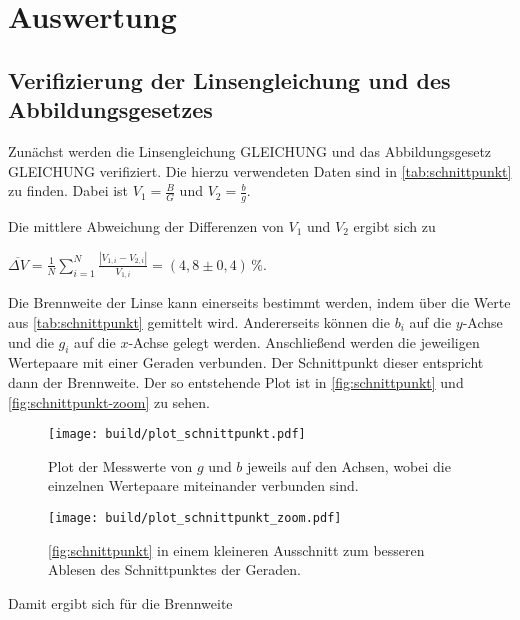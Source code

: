 \section{Auswertung}
\label{sec:Auswertung}

\subsection{Verifizierung der Linsengleichung und des Abbildungsgesetzes}

Zunächst werden die Linsengleichung GLEICHUNG und das Abbildungsgesetz GLEICHUNG verifiziert.
Die hierzu verwendeten Daten sind in \autoref{tab:schnittpunkt} zu finden.
Dabei ist $V_1 = \frac{B}{G}$ und $V_2 = \frac{b}{g}$.



Die mittlere Abweichung der Differenzen von $V_1$ und $V_2$ ergibt sich zu

\begin{center}
    $\overline{\Delta V} = \frac{1}{N} \sum^N_{i=1} \frac{| V_{1,i} - V_{2,i} |}{V_{1,i}} = (4,8 \pm 0,4) \, \%$.
\end{center}

Die Brennweite der Linse kann einerseits bestimmt werden, indem über die Werte aus \autoref{tab:schnittpunkt} gemittelt wird.
Andererseits können die $b_i$ auf die $y$-Achse und die $g_i$ auf die $x$-Achse gelegt werden. Anschließend werden die jeweiligen Wertepaare mit einer Geraden verbunden.
Der Schnittpunkt dieser entspricht dann der Brennweite.
Der so entstehende Plot ist in \autoref{fig:schnittpunkt} und \autoref{fig:schnittpunkt-zoom} zu sehen.

\begin{figure}
  \centering
  \texttt{[image: build/plot\_schnittpunkt.pdf]}
  \caption{Plot der Messwerte von $g$ und $b$ jeweils auf den Achsen, wobei die einzelnen Wertepaare miteinander verbunden sind.}
  \label{fig:schnittpunkt}
\end{figure}

\begin{figure}
  \centering
  \texttt{[image: build/plot\_schnittpunkt\_zoom.pdf]}
  \caption{\autoref{fig:schnittpunkt} in einem kleineren Ausschnitt zum besseren Ablesen des Schnittpunktes der Geraden.}
  \label{fig:schnittpunkt-zoom}
\end{figure}

Damit ergibt sich für die Brennweite

